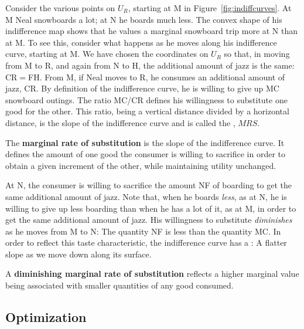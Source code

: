 \newhtmlpage

Consider the various points on $U_R$, starting at M in Figure~\ref{fig:indiffcurves}.
At M Neal snowboards a lot; at N he boards much less.
The convex shape of his indifference map shows that he values a marginal
snowboard trip more at N than at M. To see this, consider what happens as he
moves along his indifference curve, starting at M. We have chosen the
coordinates on $U_R$ so that, in moving from M to R, and again from N to H,
the additional amount of jazz is the same: CR$=$FH. From M, if Neal moves to
R, he consumes an additional amount of jazz, CR. By definition of the
indifference curve, he is willing to give up MC snowboard outings. The ratio
MC/CR defines his willingness to substitute one good for the other. This
ratio, being a vertical distance divided by a horizontal distance, is the
slope of the indifference curve and is called the , $MRS$.

\begin{DefBox}
	The \textbf{marginal rate of substitution} is the slope of the indifference curve. It defines the amount of one good the consumer is willing to sacrifice in order to obtain a given increment of the other, while maintaining utility unchanged.
\end{DefBox}

At N, the consumer is willing to sacrifice the amount NF of boarding to get
the same additional amount of jazz. Note that, when he boards \textit{less},
as at N, he is willing to give up less boarding than when he has a lot of
it, as at M, in order to get the same additional amount of jazz. His
willingness to substitute \textit{diminishes} as he moves from M to N: The
quantity NF is less than the quantity MC. In order to reflect this taste
characteristic, the indifference curve has a : A flatter slope as we move down along its
surface.

\begin{DefBox}
	A \textbf{diminishing marginal rate of substitution} reflects a higher marginal value being associated with smaller quantities of any good consumed.
\end{DefBox}

\newhtmlpage

\subsection*{Optimization}


